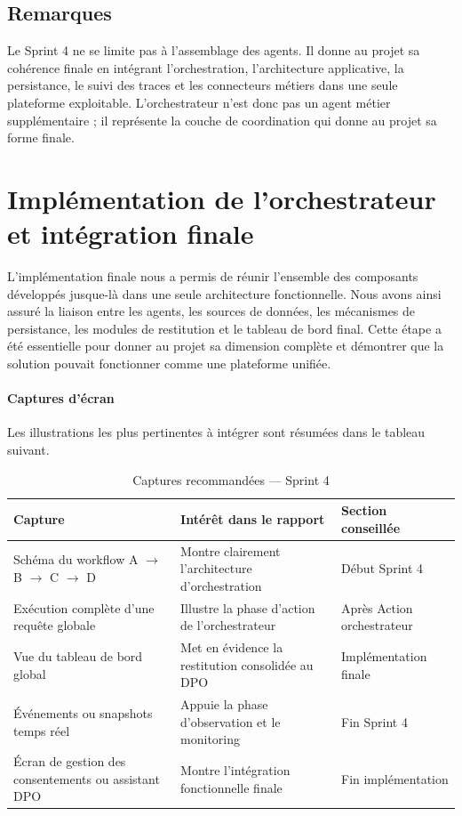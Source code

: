 \documentclass[12pt,a4paper]{report}
\begin{document}
\subsection{Remarques}

Le Sprint 4 ne se limite pas à l'assemblage des agents. Il donne au projet sa cohérence finale en intégrant l'orchestration, l'architecture applicative, la persistance, le suivi des traces et les connecteurs métiers dans une seule plateforme exploitable. L'orchestrateur n'est donc pas un agent métier supplémentaire ; il représente la couche de coordination qui donne au projet sa forme finale.

\section{Implémentation de l'orchestrateur et intégration finale}

L'implémentation finale nous a permis de réunir l'ensemble des composants développés jusque-là dans une seule architecture fonctionnelle. Nous avons ainsi assuré la liaison entre les agents, les sources de données, les mécanismes de persistance, les modules de restitution et le tableau de bord final. Cette étape a été essentielle pour donner au projet sa dimension complète et démontrer que la solution pouvait fonctionner comme une plateforme unifiée.

\paragraph{Captures d'écran}

Les illustrations les plus pertinentes à intégrer sont résumées dans le tableau suivant.

\begin{table}[H]
\centering
\caption{Captures recommandées --- Sprint 4}
\label{tab:captures_sprint4}
\begin{tabularx}{\textwidth}{|p{3.4cm}|X|p{3.2cm}|}
\hline
\textbf{Capture} & \textbf{Intérêt dans le rapport} & \textbf{Section conseillée} \\
\hline
Schéma du workflow A $\rightarrow$ B $\rightarrow$ C $\rightarrow$ D & Montre clairement l'architecture d'orchestration & Début Sprint 4 \\
\hline
Exécution complète d'une requête globale & Illustre la phase d'action de l'orchestrateur & Après Action orchestrateur \\
\hline
Vue du tableau de bord global & Met en évidence la restitution consolidée au DPO & Implémentation finale \\
\hline
Événements ou snapshots temps réel & Appuie la phase d'observation et le monitoring & Fin Sprint 4 \\
\hline
Écran de gestion des consentements ou assistant DPO & Montre l'intégration fonctionnelle finale & Fin implémentation \\
\hline
\end{tabularx}
\end{table}
\end{document}
